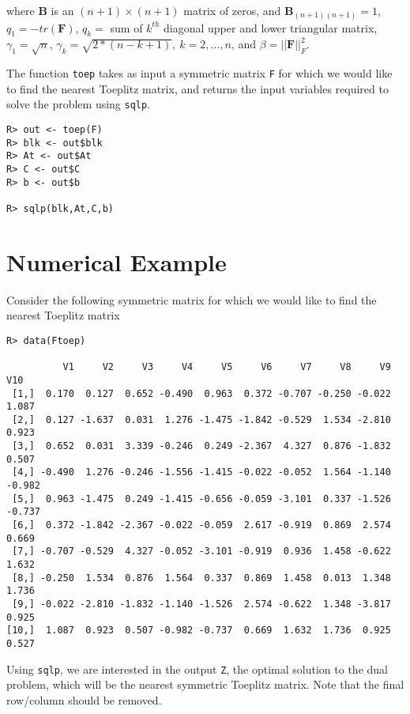 \documentclass{article}
\newcommand{\m}[1]{\mathbf{#1}}               %
\begin{document}
\noindent where $\m{B}$ is an $(n+1)\times(n+1)$ matrix of zeros, and $\m{B}_{(n+1)(n+1)} = 1$, $q_{1} = -tr(\m{F})$, $q_{k} =$ sum of $k^{th}$ diagonal upper and lower triangular matrix, $\gamma_{1} = \sqrt{n}$, $\gamma_{k} = \sqrt{2*(n-k+1)},~k=2,...,n$, and $\beta = ||\m{F}||_{F}^{2}$. 

The function \verb!toep! takes as input a symmetric matrix \verb!F! for which we would like to find the nearest Toeplitz matrix, and returns the input variables required to solve the problem using \verb!sqlp!.

\begin{verbatim}
R> out <- toep(F)
R> blk <- out$blk
R> At <- out$At
R> C <- out$C
R> b <- out$b

R> sqlp(blk,At,C,b)
\end{verbatim}

\section*{Numerical Example}

Consider the following symmetric matrix for which we would like to find the nearest Toeplitz matrix

\begin{verbatim}
R> data(Ftoep)

          V1     V2     V3     V4     V5     V6     V7     V8     V9    V10
 [1,]  0.170  0.127  0.652 -0.490  0.963  0.372 -0.707 -0.250 -0.022  1.087
 [2,]  0.127 -1.637  0.031  1.276 -1.475 -1.842 -0.529  1.534 -2.810  0.923
 [3,]  0.652  0.031  3.339 -0.246  0.249 -2.367  4.327  0.876 -1.832  0.507
 [4,] -0.490  1.276 -0.246 -1.556 -1.415 -0.022 -0.052  1.564 -1.140 -0.982
 [5,]  0.963 -1.475  0.249 -1.415 -0.656 -0.059 -3.101  0.337 -1.526 -0.737
 [6,]  0.372 -1.842 -2.367 -0.022 -0.059  2.617 -0.919  0.869  2.574  0.669
 [7,] -0.707 -0.529  4.327 -0.052 -3.101 -0.919  0.936  1.458 -0.622  1.632
 [8,] -0.250  1.534  0.876  1.564  0.337  0.869  1.458  0.013  1.348  1.736
 [9,] -0.022 -2.810 -1.832 -1.140 -1.526  2.574 -0.622  1.348 -3.817  0.925
[10,]  1.087  0.923  0.507 -0.982 -0.737  0.669  1.632  1.736  0.925  0.527
\end{verbatim}

Using \verb!sqlp!, we are interested in the output \verb!Z!, the optimal solution to the dual problem, which will be the nearest symmetric Toeplitz matrix. Note that the final row/column should be removed.
\end{document}
